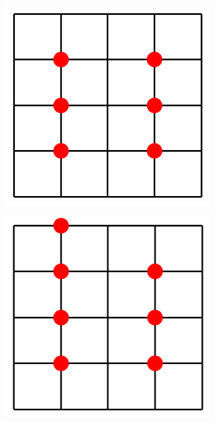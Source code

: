 \documentclass[a4paper]{article}
\begin{document}
\begin{figure}[ht]
\begin{subfigure}[b]{0.2\linewidth}
    \includegraphics[width=0.75\linewidth]{figures/maze_5x5_4.png} 
    \caption{} 
    \vspace{4ex}
  \end{subfigure}
    \begin{subfigure}[b]{0.2\linewidth}
    \centering
    \includegraphics[width=0.75\linewidth]{figures/graph_exmp.png} 
    \caption{} 
    \vspace{4ex}
  \end{subfigure}%
  \begin{subfigure}[b]{0.2\linewidth}
    \centering

\end{subfigure}
\end{figure}
\end{document}
